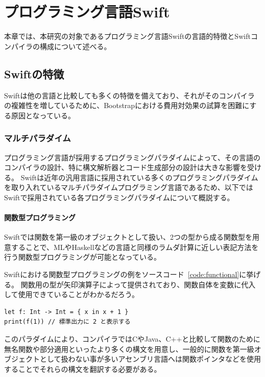 \chapter{プログラミング言語Swift}
\label{explain-swift}

本章では、本研究の対象であるプログラミング言語Swiftの言語的特徴とSwiftコンパイラの構成について述べる。

\section{Swiftの特徴}
\label{explain-swift:features}

Swiftは他の言語と比較しても多くの特徴を備えており、それがそのコンパイラの複雑性を増しているために、Bootstrapにおける費用対効果の試算を困難にする原因となっている。

\subsection{マルチパラダイム}

プログラミング言語が採用するプログラミングパラダイムによって、その言語のコンパイラの設計、特に構文解析器とコード生成部分の設計は大きな影響を受ける。
Swiftは近年の汎用言語に採用されている多くのプログラミングパラダイムを取り入れているマルチパラダイムプログラミング言語であるため、以下ではSwiftで採用されている各プログラミングパラダイムについて概説する。

\subsubsection{関数型プログラミング}

Swiftでは関数を第一級のオブジェクトとして扱い、2つの型から成る関数型を用意することで、MLやHaskellなどの言語と同様のラムダ計算に近しい表記方法を行う関数型プログラミングが可能となっている。

Swiftにおける関数型プログラミングの例をソースコード~\ref{code:functional}に挙げる。
関数用の型が矢印演算子によって提供されており、関数自体を変数に代入して使用できていることがわかるだろう。

\begin{lstlisting}[caption=Swiftにおける関数型プログラミングの例, label=code:functional]
let f: Int -> Int = { x in x + 1 }
print(f(1)) // 標準出力に 2 と表示する
\end{lstlisting}

このパラダイムにより、コンパイラではCやJava、C++と比較して関数のために無名関数や部分適用といったより多くの構文を用意し、一般的に関数を第一級オブジェクトとして扱わない事が多いアセンブリ言語へは関数ポインタなどを使用することでそれらの構文を翻訳する必要がある。

